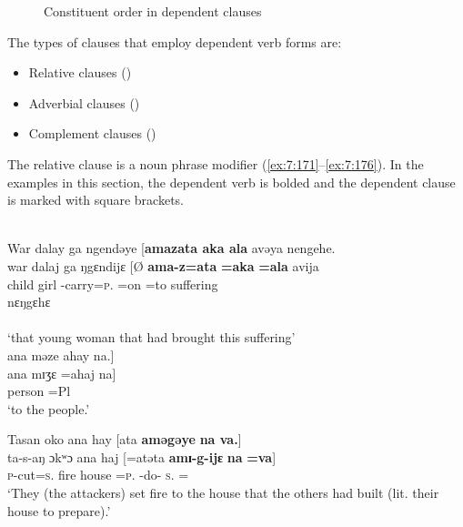 \begin{figure}
\caption{Constituent order in dependent clauses\label{fig:14}}
\end{figure}



The types of clauses that employ dependent verb forms are: 

\begin{itemize}
\item {Relative clauses}  ()
\item {Adverbial clauses}  ()
\item {Complement clauses} ()
\end{itemize}

The relative clause is a noun phrase modifier (\ref{ex:7:171}--\ref{ex:7:176}). In the examples in this section, the dependent verb is bolded and the dependent clause is marked with square brackets.


\ea\label{ex:7:171}\\
War  dalay  ga  ngendəye  [\textbf{amazata  aka  ala} avəya  nengehe.\\  
\gll  war dalaj ga ŋgɛndijɛ [Ø \textbf{ama-z=ata} \textbf{=aka} \textbf{=ala}  avija\\ 
      child girl {\ADJ} {\DEM} {} {\DEP}-carry=\textsc{p}.{\IO} =on =to suffering\\ 
      
\medskip
nɛŋgɛhɛ\\
{\DEM}\\
\glt ‘that young woman that had brought this suffering’\\
      
      \medskip
ana  məze  ahay  na.]\\      
\gll ana mɪʒɛ =ahaj na]\\
     {\DAT} person =Pl {\PSP}\\
\glt  ‘to the people.’\\
\z 

\ea\label{ex:7:172}
Tasan  oko  ana  hay  [ata  \textbf{aməgəye}  \textbf{na  va.}]\\
\gll  ta-s-aŋ    ɔkʷɔ  ana  haj   [=atəta     \textbf{amɪ-g-ijɛ} \textbf{na} \textbf{=va}]\\
      \textsc{p}-cut=\textsc{s}.{\DO}  fire  {\DAT} house    \hspaceThis{[}=\textsc{p}.{\POSS}  {\DEP}-do-{\CL}  \textsc{s}.{\DO}  ={\PRF}\\
\glt  ‘They (the attackers) set fire to the house that the others had built (lit. their house to prepare).’\\
\z 

